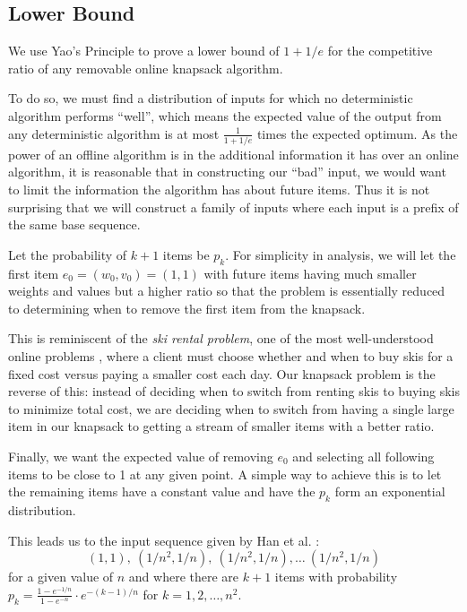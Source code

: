 \subsection{Lower Bound}
We use Yao's Principle to prove a lower bound of $1+1/e$ for the competitive ratio of any removable online knapsack algorithm.

To do so, we must find a distribution of inputs for which no deterministic algorithm performs ``well'', which means the expected value of the output from any deterministic algorithm is at most $\frac{1}{1+1/e}$ times the expected optimum. As the power of an offline algorithm is in the additional information it has over an online algorithm, it is reasonable that in constructing our ``bad'' input, we would want to limit the information the algorithm has about future items. Thus it is not surprising that we will construct a family of inputs where each input is a prefix of the same base sequence.

Let the probability of $k+1$ items be $p_k$. For simplicity in analysis, we will let the first item $e_0=(w_0,v_0)=(1,1)$ with future items having much smaller weights and values but a higher ratio so that the problem is essentially reduced to determining when to remove the first item from the knapsack.

This is reminiscent of the \emph{ski rental problem}, one of the most well-understood online problems \cite{karlin}, where a client must choose whether and when to buy skis for a fixed cost versus paying a smaller cost each day. Our knapsack problem is the reverse of this: instead of deciding when to switch from renting skis to buying skis to minimize total cost, we are deciding when to switch from having a single large item in our knapsack to getting a stream of smaller items with a better ratio.

Finally, we want the expected value of removing $e_0$ and selecting all following items to be close to 1 at any given point. A simple way to achieve this is to let the remaining items have a constant value and have the $p_k$ form an exponential distribution.

This leads us to the input sequence given by Han et al. \cite{han}:
\[(1,1),\ (1/n^2,1/n),\ (1/n^2,1/n),\ldots\ (1/n^2,1/n)\]
for a given value of $n$ and where there are $k+1$ items with probability $p_k = \frac{1-e^{-1/n}}{1-e^{-n}} \cdot e^{-(k-1)/n}$ for $k=1,2,\ldots,n^2$.


